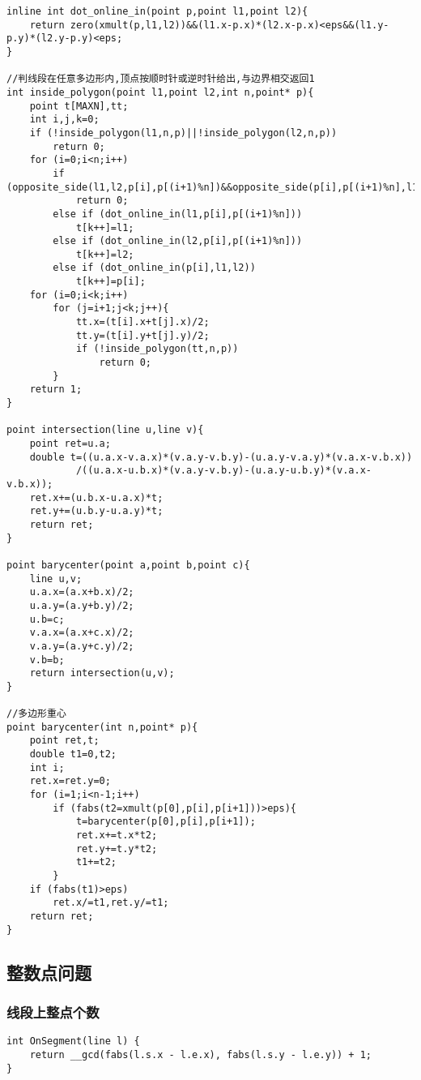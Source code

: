 \documentclass[a4paper]{article}
\begin{document}
\begin{lstlisting}
inline int dot_online_in(point p,point l1,point l2){
    return zero(xmult(p,l1,l2))&&(l1.x-p.x)*(l2.x-p.x)<eps&&(l1.y-p.y)*(l2.y-p.y)<eps;
}
 
//判线段在任意多边形内,顶点按顺时针或逆时针给出,与边界相交返回1
int inside_polygon(point l1,point l2,int n,point* p){
    point t[MAXN],tt;
    int i,j,k=0;
    if (!inside_polygon(l1,n,p)||!inside_polygon(l2,n,p))
        return 0;
    for (i=0;i<n;i++)
        if (opposite_side(l1,l2,p[i],p[(i+1)%n])&&opposite_side(p[i],p[(i+1)%n],l1,l2))
            return 0;
        else if (dot_online_in(l1,p[i],p[(i+1)%n]))
            t[k++]=l1;
        else if (dot_online_in(l2,p[i],p[(i+1)%n]))
            t[k++]=l2;
        else if (dot_online_in(p[i],l1,l2))
            t[k++]=p[i];
    for (i=0;i<k;i++)
        for (j=i+1;j<k;j++){
            tt.x=(t[i].x+t[j].x)/2;
            tt.y=(t[i].y+t[j].y)/2;
            if (!inside_polygon(tt,n,p))
                return 0;          
        }
    return 1;
}
 
point intersection(line u,line v){
    point ret=u.a;
    double t=((u.a.x-v.a.x)*(v.a.y-v.b.y)-(u.a.y-v.a.y)*(v.a.x-v.b.x))
            /((u.a.x-u.b.x)*(v.a.y-v.b.y)-(u.a.y-u.b.y)*(v.a.x-v.b.x));
    ret.x+=(u.b.x-u.a.x)*t;
    ret.y+=(u.b.y-u.a.y)*t;
    return ret;
}
 
point barycenter(point a,point b,point c){
    line u,v;
    u.a.x=(a.x+b.x)/2;
    u.a.y=(a.y+b.y)/2;
    u.b=c;
    v.a.x=(a.x+c.x)/2;
    v.a.y=(a.y+c.y)/2;
    v.b=b;
    return intersection(u,v);
}
 
//多边形重心
point barycenter(int n,point* p){
    point ret,t;
    double t1=0,t2;
    int i;
    ret.x=ret.y=0;
    for (i=1;i<n-1;i++)
        if (fabs(t2=xmult(p[0],p[i],p[i+1]))>eps){
            t=barycenter(p[0],p[i],p[i+1]);
            ret.x+=t.x*t2;
            ret.y+=t.y*t2;
            t1+=t2;
        }
    if (fabs(t1)>eps)
        ret.x/=t1,ret.y/=t1;
    return ret;
}
\end{lstlisting}
\subsection{整数点问题}
\subsubsection{线段上整点个数}
\begin{lstlisting}
int OnSegment(line l) {
	return __gcd(fabs(l.s.x - l.e.x), fabs(l.s.y - l.e.y)) + 1;
}
\end{lstlisting}
\end{document}
